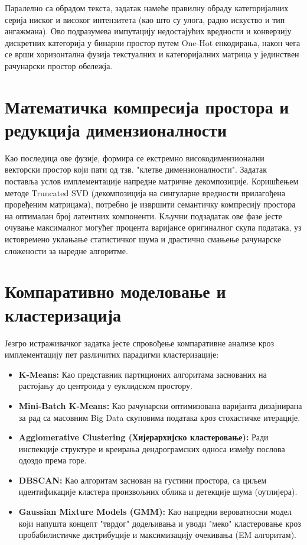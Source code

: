 \documentclass[a4paper,12pt]{report}
\begin{document}
	Паралелно са обрадом текста, задатак намеће правилну обраду категоријалних серија ниског и високог интензитета (као што су улога, радно искуство и тип ангажмана). Ово подразумева импутацију недостајућих вредности и конверзију дискретних категорија у бинарни простор путем One-Hot енкодирања, након чега се врши хоризонтална фузија текстуалних и категоријалних матрица у јединствен рачунарски простор обележја.
	
	\section{Математичка компресија простора и редукција димензионалности}
	Као последица ове фузије, формира се екстремно високодимензионални векторски простор који пати од тзв. "клетве димензионалности". Задатак поставља услов имплементације напредне матричне декомпозиције. Коришћењем методе Truncated SVD (декомпозиција на сингуларне вредности прилагођена проређеним матрицама), потребно је извршити семантичку компресију простора на оптималан број латентних компоненти. Кључни подзадатак ове фазе јесте очување максималног могућег процента варијансе оригиналног скупа података, уз истовремено уклањање статистичког шума и драстично смањење рачунарске сложености за наредне алгоритме.
	
	\section{Компаративно моделовање и кластеризација}
	Језгро истраживачког задатка јесте спровођење компаративне анализе кроз имплементацију пет различитих парадигми кластеризације:
	
	\begin{itemize}
	\item \textbf{K-Means:} Као представник партиционих алгоритама заснованих на растојању до центроида у еуклидском простору.
	
	\item \textbf{Mini-Batch K-Means:} Као рачунарски оптимизована варијанта дизајнирана за рад са масовним Big Data скуповима података кроз стохастичке итерације.
	
	\item \textbf{Agglomerative Clustering (Хијерархијско кластеровање):} Ради инспекције структуре и креирања дендрограмских односа између послова одоздо према горе.
	
	\item \textbf{DBSCAN:} Као алгоритам заснован на густини простора, са циљем идентификације кластера произвољних облика и детекције шума (оутлијера).
	
	\item \textbf{Gaussian Mixture Models (GMM):} Као напредни вероватносни модел који напушта концепт "тврдог" додељивања и уводи "меко" кластеровање кроз пробабилистичке дистрибуције и максимизацију очекивања (EM алгоритам).
	
	\end{itemize}
\end{document}
